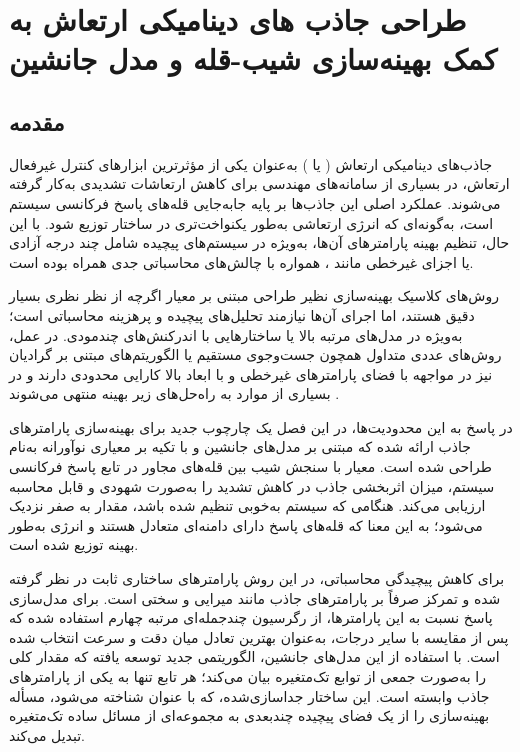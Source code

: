 \chapter{طراحی جاذب های دینامیکی ارتعاش به کمک بهینه‌سازی شیب-قله و مدل جانشین }

\section{مقدمه}

جاذب‌های دینامیکی ارتعاش 
( یا 
)
 به‌عنوان یکی از مؤثرترین ابزارهای کنترل غیرفعال ارتعاش، در بسیاری از سامانه‌های مهندسی برای کاهش ارتعاشات تشدیدی به‌کار گرفته می‌شوند. عملکرد اصلی این جاذب‌ها بر پایه جابه‌جایی قله‌های پاسخ فرکانسی سیستم است، به‌گونه‌ای که انرژی ارتعاشی به‌طور یکنواخت‌تری در ساختار توزیع شود. با این حال، تنظیم بهینه پارامترهای آن‌ها، به‌ویژه در سیستم‌های پیچیده شامل چند درجه آزادی یا اجزای غیرخطی مانند 
 ، همواره با چالش‌های محاسباتی جدی همراه بوده است.

روش‌های کلاسیک بهینه‌سازی نظیر طراحی مبتنی بر معیار 
 اگرچه از نظر نظری بسیار دقیق هستند، اما اجرای آن‌ها نیازمند تحلیل‌های پیچیده و پرهزینه محاسباتی است؛ به‌ویژه در مدل‌های مرتبه بالا یا ساختارهایی با اندرکنش‌های چندمودی. در عمل، روش‌های عددی متداول همچون جست‌وجوی مستقیم یا الگوریتم‌های مبتنی بر گرادیان نیز در مواجهه با فضای پارامترهای غیرخطی و با ابعاد بالا کارایی محدودی دارند و در بسیاری از موارد به راه‌حل‌های زیر بهینه منتهی می‌شوند \cite{chang1980structural, housner1997structural}.

در پاسخ به این محدودیت‌ها، در این فصل یک چارچوب جدید برای بهینه‌سازی پارامترهای جاذب ارائه شده که مبتنی بر مدل‌های جانشین و با تکیه بر معیاری نوآورانه به‌نام  طراحی شده است. معیار 
 با سنجش شیب بین قله‌های مجاور در تابع پاسخ فرکانسی سیستم، میزان اثربخشی جاذب در کاهش تشدید را به‌صورت شهودی و قابل محاسبه ارزیابی می‌کند. هنگامی که سیستم به‌خوبی تنظیم شده باشد، مقدار 
  به صفر نزدیک می‌شود؛ به این معنا که قله‌های پاسخ دارای دامنه‌ای متعادل هستند و انرژی به‌طور بهینه توزیع شده است.

برای کاهش پیچیدگی محاسباتی، در این روش پارامترهای ساختاری ثابت در نظر گرفته شده و تمرکز صرفاً بر پارامترهای جاذب مانند میرایی و سختی است. برای مدل‌سازی پاسخ 
 نسبت به این پارامترها، از رگرسیون چندجمله‌ای مرتبه چهارم استفاده شده که پس از مقایسه با سایر درجات، به‌عنوان بهترین تعادل میان دقت و سرعت انتخاب شده است. با استفاده از این مدل‌های جانشین، الگوریتمی جدید توسعه یافته که مقدار کلی 
  را به‌صورت جمعی از توابع تک‌متغیره بیان می‌کند؛ هر تابع تنها به یکی از پارامترهای جاذب وابسته است. این ساختار جداسازی‌شده، که با عنوان  شناخته می‌شود، مسأله بهینه‌سازی را از یک فضای پیچیده چندبعدی به مجموعه‌ای از مسائل ساده تک‌متغیره تبدیل می‌کند.

